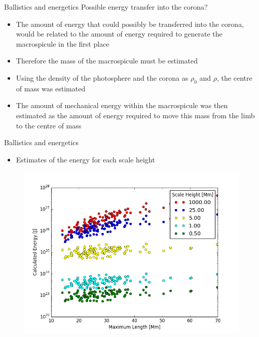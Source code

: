 \documentclass{beamer}
\begin{document}
	\begin{frame}{Ballistics and energetics}
		Possible energy transfer into the corona?
		\begin{itemize}
			\item{The amount of energy that could possibly be transferred into the corona, would be related to the amount of energy required to generate the macrospicule in the first place}
			\item{Therefore the mass of the macrospicule must be estimated}
			\item{Using the density of the photosphere and the corona as $\rho_0$ and $\rho$, the centre of mass was estimated}
			\item{The amount of mechanical energy within the macrospicule was then estimated as the amount of energy required to move this mass from the limb to the centre of mass}
		\end{itemize}
	\end{frame}	
	
	\begin{frame}{Ballistics and energetics}
		\begin{itemize}
			\item{Estimates of the energy for each scale height}
		\end{itemize}
		\begin{figure}
			\centering	
				\includegraphics[scale = 0.35]{Figs/scale_h.png}
		\end{figure}
	\end{frame}
\end{document}

